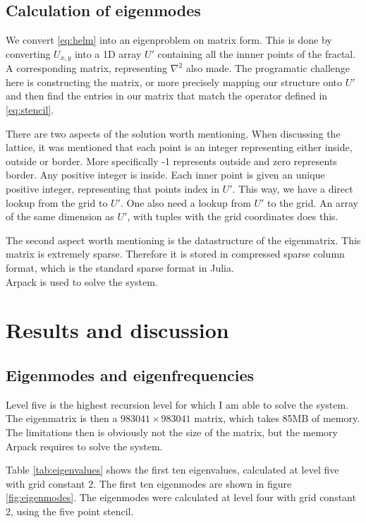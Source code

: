\documentclass[a4paper, 12pt]{article}
\begin{document}
\subsection{Calculation of eigenmodes}
We convert \eqref{eq:helm} into an eigenproblem on matrix form.
This is done by converting $U_{x,y}$ into a 1D array $U'$ containing all the innner points of the fractal.
A corresponding matrix, representing $\nabla^2$ also made.
The programatic challenge here is constructing the matrix, or more precisely mapping our structure onto $U'$ and then find the entries in our matrix that match the operator defined in  \eqref{eq:stencil}.

There are two aspects of the solution worth mentioning.
When discussing the lattice, it was mentioned that each point is an integer representing either inside, outside or border.
More specifically -1 represents outside and zero represents border.
Any positive integer is inside.
Each inner point is given an unique positive integer, representing that points index in $U'$.
This way, we have a direct lookup from the grid to $U'$.
One also need a lookup from $U'$ to the grid.
An array of the same dimension as $U'$, with tuples with the grid coordinates does this.

The second aspect worth mentioning is the datastructure of the eigenmatrix.
This matrix is extremely sparse.
Therefore it is  stored in compressed sparse column format, which is the standard sparse format in Julia.\\

Arpack is used to solve the system.

\section{Results and discussion}
\subsection{Eigenmodes and eigenfrequencies}
Level five is the highest recursion level for which I am able to solve the system.
The eigenmatrix is then a $983041\times 983041$ matrix, which takes 85MB of memory.
The limitations then is obviously not the size of the matrix, but the memory Arpack requires to solve the system.

Table \ref{tab:eigenvalues} shows the first ten eigenvalues, calculated at level five with grid constant 2.
The first ten eigenmodes are shown in figure \ref{fig:eigenmodes}.
The eigenmodes were calculated at level four with grid constant 2, using the five point stencil.
\end{document}
